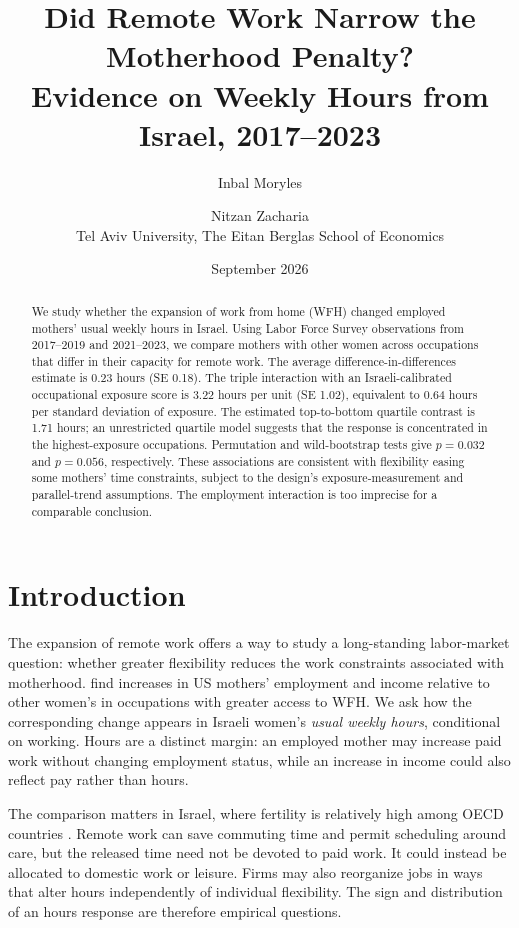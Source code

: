 \documentclass[12pt,a4paper]{article}
\title{Did Remote Work Narrow the Motherhood Penalty?\\
\large Evidence on Weekly Hours from Israel, 2017--2023}
\author{Inbal Moryles \and Nitzan Zacharia\\
\small Tel Aviv University, The Eitan Berglas School of Economics}
\date{September 2026}
\begin{document}
\maketitle
\begin{abstract}
We study whether the expansion of work from home (WFH) changed employed mothers' usual weekly hours in Israel. Using Labor Force Survey observations from 2017--2019 and 2021--2023, we compare mothers with other women across occupations that differ in their capacity for remote work. The average difference-in-differences estimate is 0.23 hours (SE 0.18). The triple interaction with an Israeli-calibrated occupational exposure score is 3.22 hours per unit (SE 1.02), equivalent to 0.64 hours per standard deviation of exposure. The estimated top-to-bottom quartile contrast is 1.71 hours; an unrestricted quartile model suggests that the response is concentrated in the highest-exposure occupations. Permutation and wild-bootstrap tests give $p=0.032$ and $p=0.056$, respectively. These associations are consistent with flexibility easing some mothers' time constraints, subject to the design's exposure-measurement and parallel-trend assumptions. The employment interaction is too imprecise for a comparable conclusion.
\end{abstract}

\section{Introduction}\label{sec:intro}
The expansion of remote work offers a way to study a long-standing labor-market question: whether greater flexibility reduces the work constraints associated with motherhood. \citet{harrington2025} find increases in US mothers' employment and income relative to other women's in occupations with greater access to WFH. We ask how the corresponding change appears in Israeli women's \emph{usual weekly hours}, conditional on working. Hours are a distinct margin: an employed mother may increase paid work without changing employment status, while an increase in income could also reflect pay rather than hours.

The comparison matters in Israel, where fertility is relatively high among OECD countries \citep{oecd2025fertility}. Remote work can save commuting time and permit scheduling around care, but the released time need not be devoted to paid work. It could instead be allocated to domestic work or leisure. Firms may also reorganize jobs in ways that alter hours independently of individual flexibility. The sign and distribution of an hours response are therefore empirical questions.
\end{document}
